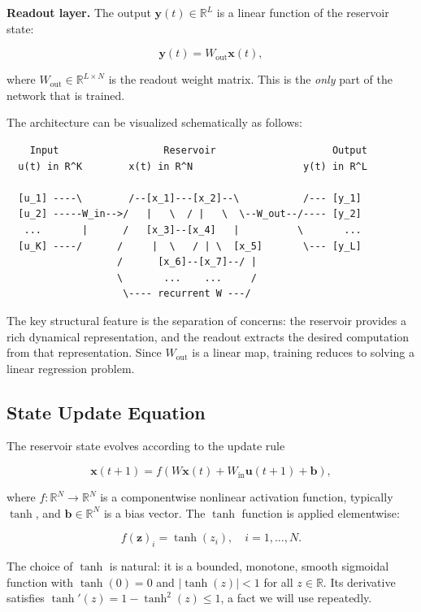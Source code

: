 \textbf{Readout layer.} The output $\mathbf{y}(t) \in \mathbb{R}^L$ is a linear function of the reservoir state:

\[
\mathbf{y}(t) = W_{\text{out}} \mathbf{x}(t),
\]

where $W_{\text{out}} \in \mathbb{R}^{L \times N}$ is the readout weight matrix. This is the \textit{only} part of the network that is trained.

The architecture can be visualized schematically as follows:

\begin{lstlisting}
    Input                  Reservoir                    Output
  u(t) in R^K        x(t) in R^N                   y(t) in R^L

  [u_1] ----\        /--[x_1]---[x_2]--\           /--- [y_1]
  [u_2] -----W_in-->/   |   \  / |   \  \--W_out--/---- [y_2]
   ...       |      /   [x_3]--[x_4]   |          \       ...
  [u_K] ----/      /     |  \   / | \  [x_5]       \--- [y_L]
                   /      [x_6]--[x_7]--/ |
                   \       ...    ...     /
                    \---- recurrent W ---/
\end{lstlisting}

The key structural feature is the separation of concerns: the reservoir provides a rich dynamical representation, and the readout extracts the desired computation from that representation. Since $W_{\text{out}}$ is a linear map, training reduces to solving a linear regression problem.

\subsection{State Update Equation}\label{sec:14.1.2}

The reservoir state evolves according to the update rule

\begin{equation}\label{eq:14.1}\tag{14.1}
\mathbf{x}(t+1) = f\!\left(W\mathbf{x}(t) + W_{\text{in}}\mathbf{u}(t+1) + \mathbf{b}\right),
\end{equation}

where $f: \mathbb{R}^N \to \mathbb{R}^N$ is a componentwise nonlinear activation function, typically $\tanh$, and $\mathbf{b} \in \mathbb{R}^N$ is a bias vector. The $\tanh$ function is applied elementwise:

\[
f(\mathbf{z})_i = \tanh(z_i), \quad i = 1, \ldots, N.
\]

The choice of $\tanh$ is natural: it is a bounded, monotone, smooth sigmoidal function with $\tanh(0) = 0$ and $|\tanh(z)| < 1$ for all $z \in \mathbb{R}$. Its derivative satisfies $\tanh'(z) = 1 - \tanh^2(z) \leq 1$, a fact we will use repeatedly.

